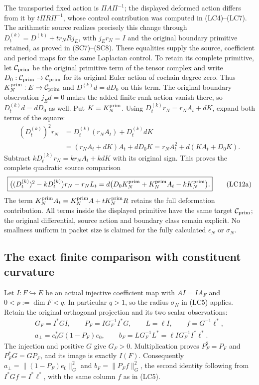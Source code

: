 The transported fixed action is \(\Pi A\Pi^{-1}\); the displayed
deformed action differs from it by \(t\Pi R\Pi^{-1}\), whose
control contribution was computed in (LC4)--(LC7). The arithmetic
source realizes precisely this change through
\(D_t^{(k)}=D^{(k)}+t r_NRj_E\), with
\(j_Er_N=I\) and the original boundary primitive retained, as
proved in (SC7)--(SC8). These equalities supply the source,
coefficient and period maps for the same Laplacian control.
To retain its complete primitive, let $\mathcal C_{\rm prim}$
be the original primitive term of the tensor complex and write
$D_0:\mathcal C_{\rm prim}\to\mathcal C_{\rm prim}$ for its
original Euler action of cochain degree zero. Thus
$K_N^{\rm prim}:E\to\mathcal C_{\rm prim}$ and
$D^{(k)}d=dD_0$ on this term. The original boundary observation
$j_Ed=0$ makes the added finite-rank action vanish there, so
$D_t^{(k)}d=dD_0$ as well. Put $K=K_N^{\rm prim}$.
Using $D_t^{(k)}r_N=r_NA_t+dK$, expand both terms of the square:
\[
\begin{split}
 (D_t^{(k)})^2r_N
 &=D_t^{(k)}(r_NA_t)+D_t^{(k)}dK\\
 &=(r_NA_t+dK)A_t+dD_0K
   =r_NA_t^2+d(KA_t+D_0K).
\end{split}
\]
Subtract $kD_t^{(k)}r_N=kr_NA_t+kdK$ with its original sign.
This proves the complete quadratic source comparison
\[
 \boxed{\bigl((D_t^{(k)})^2-kD_t^{(k)}\bigr)r_N-r_NL_t
       =d\bigl(D_0K_N^{\rm prim}+K_N^{\rm prim}A_t
                                      -kK_N^{\rm prim}\bigr).}
 \tag{LC12a}
\]
The term $K_N^{\rm prim}A_t=K_N^{\rm prim}A+
tK_N^{\rm prim}R$ retains the full deformation contribution.
All terms inside the displayed primitive have the same target
$\mathcal C_{\rm prim}$; the original differential, source action
and boundary class remain explicit.
No smallness uniform in packet size is claimed for the fully
calculated \(\epsilon_N\) or \(\sigma_N\).

\subsection{The exact finite comparison with constituent curvature}

Let $I:F\hookrightarrow E$ be an actual injective coefficient map
with $AI=IA_F$ and $0<p:=\dim F<q$. In particular $q>1$, so
the radius $\sigma_N$ in (LC5) applies. Retain the original
orthogonal projection and its two scalar observations:
\[
\begin{gathered}
 G_F=I^*GI,\qquad P_F=I G_F^{-1}I^*G,\qquad L=\ell I,\qquad
 f=G^{-1}\ell^*,\\
 a_\perp=e_0^*G(1-P_F)e_0,\qquad
 b_F=L G_F^{-1}L^*=\ell I G_F^{-1}I^*\ell^*.
\end{gathered}\tag{LC13}
\]
The injection and positive $G$ give $G_F>0$. Multiplication proves
$P_F^2=P_F$ and $P_F^*G=GP_F$, and its image is exactly $I(F)$.
Consequently $a_\perp=\|(1-P_F)e_0\|_G^2$ and
$b_F=\|P_Ff\|_G^2$, the second identity following from
$I^*Gf=I^*\ell^*$, with the same column $f$ as in (LC5).

